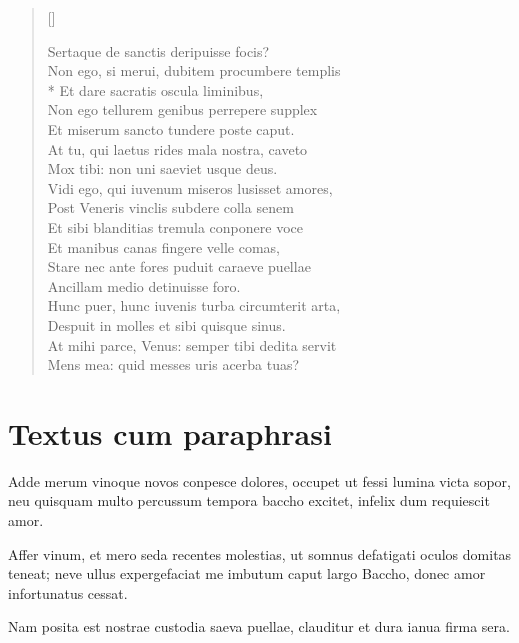 \begin{verse}[\versewidth]
\begin{altverse}
{Sertaque de sanctis deripuisse focis?\\
Non ego, si merui, dubitem procumbere templis\\*
Et dare sacratis oscula liminibus,\\
Non ego tellurem genibus perrepere supplex\\
Et miserum sancto tundere poste caput.\\
At tu, qui laetus rides mala nostra, caveto\\
Mox tibi: non uni saeviet usque deus.\\
Vidi ego, qui iuvenum miseros lusisset amores,\\
Post Veneris vinclis subdere colla senem\\
Et sibi blanditias tremula conponere voce\\
Et manibus canas fingere velle comas,\\
Stare nec ante fores puduit caraeve puellae\\
Ancillam medio detinuisse foro.\\
Hunc puer, hunc iuvenis turba circumterit arta,\\
Despuit in molles et sibi quisque sinus.\\
At mihi parce, Venus: semper tibi dedita servit\\
Mens mea: quid messes uris acerba tuas? \\

}
\end{altverse}
\end{verse}

\newpage

\section*{Textus cum paraphrasi}

{\large

\noindent Adde merum vinoque novos conpesce dolores, occupet ut fessi lumina victa sopor, neu quisquam multo percussum tempora baccho excitet, infelix dum requiescit amor.\\

}


\noindent Affer vinum, et mero seda recentes molestias, ut somnus defatigati oculos domitas teneat; neve ullus expergefaciat me imbutum caput largo Baccho, donec amor infortunatus cessat.\\

{\large

\noindent Nam posita est nostrae custodia saeva puellae, clauditur et dura ianua firma sera.\\

}


